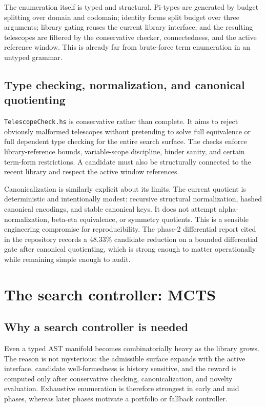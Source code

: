 \documentclass[pdflatex,sn-mathphys,Numbered]{sn-jnl}
\theoremstyle{thmstyleone}
\theoremstyle{thmstylethree}
\theoremstyle{thmstyletwo}
\begin{document}
The enumeration itself is typed and structural. Pi-types are generated by budget splitting over domain and codomain; identity forms split budget over three arguments; library gating reuses the current library interface; and the resulting telescopes are filtered by the conservative checker, connectedness, and the active reference window. This is already far from brute-force term enumeration in an untyped grammar.

\subsection{Type checking, normalization, and canonical quotienting}

\texttt{TelescopeCheck.hs} is conservative rather than complete. It aims to reject obviously malformed telescopes without pretending to solve full equivalence or full dependent type checking for the entire search surface. The checks enforce library-reference bounds, variable-scope discipline, binder sanity, and certain term-form restrictions. A candidate must also be structurally connected to the recent library and respect the active window references.

Canonicalization is similarly explicit about its limits. The current quotient is deterministic and intentionally modest: recursive structural normalization, hashed canonical encodings, and stable canonical keys. It does not attempt alpha-normalization, beta-eta equivalence, or symmetry quotients. This is a sensible engineering compromise for reproducibility. The phase-2 differential report cited in the repository records a 48.33\% candidate reduction on a bounded differential gate after canonical quotienting, which is strong enough to matter operationally while remaining simple enough to audit.

\section{The search controller: MCTS}\label{sec:mcts}

\subsection{Why a search controller is needed}

Even a typed AST manifold becomes combinatorially heavy as the library grows. The reason is not mysterious: the admissible surface expands with the active interface, candidate well-formedness is history sensitive, and the reward is computed only after conservative checking, canonicalization, and novelty evaluation. Exhaustive enumeration is therefore strongest in early and mid phases, whereas later phases motivate a portfolio or fallback controller.
\end{document}
